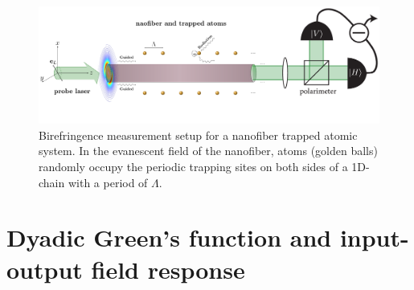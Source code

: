 \documentclass[preprint,aps,pra,onecolumn]{revtex4-1} %
\begin{document}
\begin{figure}
\centering
\includegraphics[scale=0.35]{./Figs/BirefringenceMeasurement_randomAtoms}
\caption{Birefringence measurement setup for a nanofiber trapped atomic system. In the evanescent 
field of the nanofiber, atoms (golden balls) randomly  occupy the periodic trapping sites on both sides of 
a 1D-chain with a period of $\Lambda$.}
\label{fig:BirefringenceMeasurement}
\end{figure}

\section{Dyadic Green's function and input-output field response}
\end{document}
